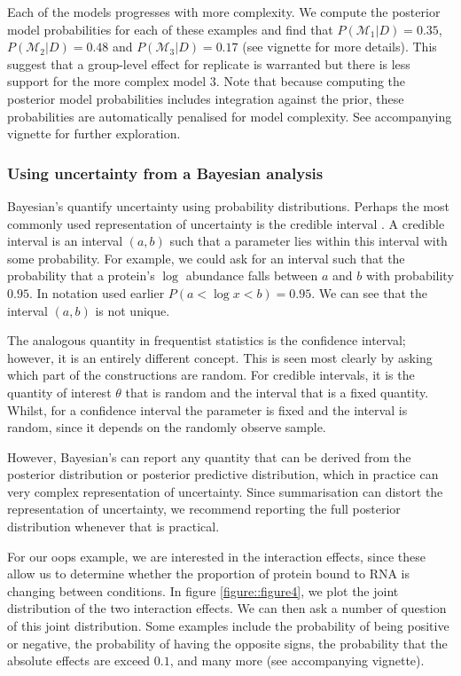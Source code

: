\documentclass[12pt,english, journal=jpr, layout=twocolumn]{article}
\begin{document}
Each of the models progresses with more complexity. We compute the posterior model probabilities for each of these examples and find that $P(\mathcal{M}_1|D) = 0.35$, $P(\mathcal{M}_2|D) = 0.48$ and $P(\mathcal{M}_3|D) = 0.17$ (see vignette for more details). This suggest that a group-level effect for replicate is warranted but there is less support for the more complex model 3. Note that because computing the posterior model probabilities includes integration against the prior, these probabilities are automatically penalised for model complexity. See accompanying vignette for further exploration. 

\subsubsection{Using uncertainty from a Bayesian analysis}
Bayesian's quantify uncertainty using probability distributions. Perhaps the most commonly used representation of uncertainty is the credible interval \citep{Gelman::1995}. A credible interval is an interval $(a,b)$ such that a parameter lies within this interval with some probability. For example, we could ask for an interval such that the probability that a protein's $\log$ abundance falls between $a$ and $b$ with probability $0.95$. In notation used earlier $P(a < \log x < b) = 0.95$. We can see that the interval $(a,b)$ is not unique. 

The analogous quantity in frequentist statistics is the confidence interval; however, it is an entirely different concept. This is seen most clearly by asking which part of the constructions are random. For credible intervals, it is the quantity of interest $\theta$ that is random and the interval that is a fixed quantity. Whilst, for a confidence interval the parameter is fixed and the interval is random, since it depends on the randomly observe sample. 

However, Bayesian's can report any quantity that can be derived from the posterior distribution or posterior predictive distribution, which in practice can very complex representation of uncertainty. Since summarisation can distort the representation of uncertainty, we recommend reporting the full posterior distribution whenever that is practical.

For our oops example, we are interested in the interaction effects, since these allow us to determine whether the proportion of protein bound to RNA is changing between conditions. In figure \ref{figure::figure4}, we plot the joint distribution of the two interaction effects. We can then ask a number of question of this joint distribution. Some examples include the probability of being positive or negative, the probability of having the opposite signs, the probability that the absolute effects are exceed $0.1$, and many more (see accompanying vignette). 
\end{document}
